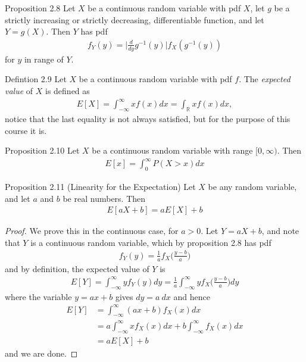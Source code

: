 \begin{boks}{Proposition 2.8}
Let $X$ be a continuous random variable with pdf $X$, let $g$ be a strictly increasing or strictly decreasing, differentiable function, and let $Y = g(X)$. Then $Y$ has pdf
\begin{align*}
    f_Y(y) = \bigg| \frac{d}{dy}g^{-1}(y)\bigg| f_X(g^{-1}(y))
\end{align*}
for $y$ in range of $Y$.
\end{boks}

\begin{boks}{Defintion 2.9}
Let $X$ be a continuous random variable with pdf $f$. The \textit{expected value} of $X$ is defined as
\begin{align*}
    E[X] = \int_{-\infty}^\infty xf(x)dx = \int_\mathbb{R} xf(x)dx,
\end{align*}
notice that the last equality is not always satisfied, but for the purpose of this course it is.
\end{boks}

\begin{boks}{Proposition 2.10}
Let $X$ be a continuous random variable with range $[0, \infty)$. Then
\begin{align*}
    E[x] = \int_0^\infty P(X > x)dx
\end{align*}
\end{boks}

\begin{boks}{Proposition 2.11 (Linearity for the Expectation)}
Let $X$ be any random variable, and let $a$ and $b$ be real numbers. Then
\begin{align*}
    E[aX + b] = aE[X] + b
\end{align*}
\end{boks}

\begin{proof}
We prove this in the continuous case, for $a > 0$. Let $Y = aX + b$, and note that $Y$ is a continuous random variable, which by proposition 2.8 has pdf
\begin{align*}
    f_Y(y) = \frac{1}{a} f_X\bigg(\frac{y-b}{a}\bigg)
\end{align*}
and by definition, the expected value of $Y$ is
\begin{align*}
    E[Y] = \int_{-\infty}^\infty yf_Y(y)dy = \frac{1}{a}\int_{-\infty}^\infty yf_X\bigg(\frac{y-b}{a}\bigg)dy
\end{align*}
where the variable $y=ax+b$ gives $dy = a \ dx$ and hence
\begin{align*}
    E[Y] &= \int_{-\infty}^\infty (ax + b)f_X(x)dx \\
    &= a \int_{-\infty}^\infty xf_X(x)dx + b \int_{-\infty}^\infty f_X(x)dx \\
    &= aE[X] + b
\end{align*}
and we are done.
\end{proof}

